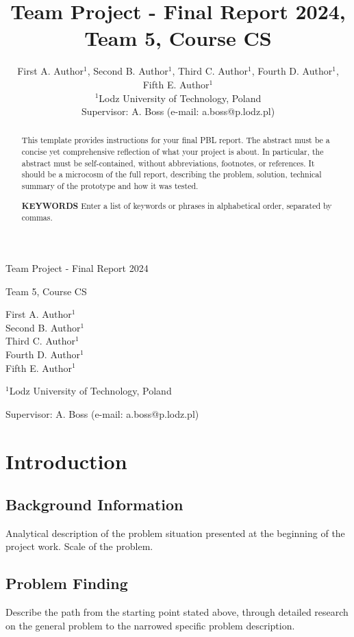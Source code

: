 \documentclass{article}
\title{Team Project - Final Report 2024, Team 5, Course CS}
\author{First A. Author$^1$, Second B. Author$^1$, Third C. Author$^1$, Fourth D. Author$^1$, Fifth E. Author$^1$ \\
$^1$Lodz University of Technology, Poland \\
Supervisor: A. Boss (e-mail: a.boss@p.lodz.pl)}
\date{}
\begin{document}
\begin{titlepage}
\centering
\vspace*{\fill}
{\LARGE Team Project - Final Report 2024 \par}
\vspace{1cm}
{\Large Team 5, Course CS \par}
\vspace{2cm}
{\LARGE First A. Author$^1$ \\ Second B. Author$^1$ \\ Third C. Author$^1$ \\ Fourth D. Author$^1$ \\ Fifth E. Author$^1$ \par}
\vspace{0.5cm}
{\large $^1$Lodz University of Technology, Poland \par}
\vspace{0.5cm}
{\large Supervisor: A. Boss (e-mail: a.boss@p.lodz.pl) \par}
\vspace*{\fill}
\end{titlepage}

\begin{abstract}
This template provides instructions for your final PBL report. The abstract must be a concise yet comprehensive reflection of what your project is about. In particular, the abstract must be self-contained, without abbreviations, footnotes, or references. It should be a microcosm of the full report, describing the problem, solution, technical summary of the prototype and how it was tested.

\textbf{KEYWORDS} Enter a list of keywords or phrases in alphabetical order, separated by commas.
\end{abstract}

\section{Introduction}

\subsection{Background Information}
Analytical description of the problem situation presented at the beginning of the project work. Scale of the problem.

\subsection{Problem Finding}
Describe the path from the starting point stated above, through detailed research on the general problem to the narrowed specific problem description.
\end{document}
